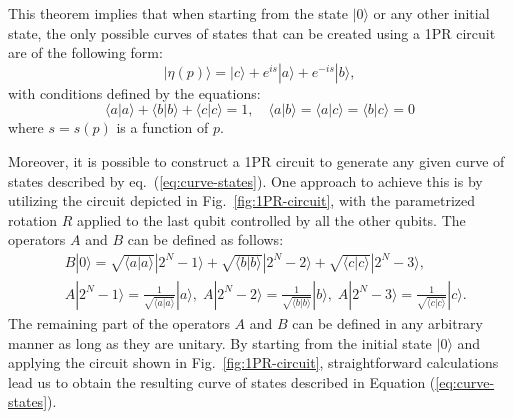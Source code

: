 \documentclass[10pt,letterpaper]{article} %
\newcommand{\fref}[1]{Fig.~\ref{#1}}
\newcommand{\eref}[1]{eq.~(\ref{#1})}
\begin{document}
This theorem implies that when starting from the state $|0\rangle$ 
or any other initial state, the only possible curves of states that can be 
created using a 1PR circuit are of the following form:
\begin{equation}
|\eta(p)\rangle = |c\rangle + e^{is}|a\rangle + e^{-is} |b\rangle,
\label{eq:curve-states}
\end{equation}
with conditions defined by the equations: 
\begin{equation}
\langle a| a\rangle + \langle b| b\rangle + \langle c| c\rangle = 1,  \quad
\langle a |b\rangle =
\langle a |c\rangle =
\langle b |c\rangle = 0
\label{eq:conditions-vecs}
\end{equation}
where $s = s(p)$ is a function of $p$. 

Moreover, it is possible to construct a 1PR circuit to generate any given curve of 
states described by \eref{eq:curve-states}. 
One approach to achieve this is by utilizing the circuit 
depicted in \fref{fig:1PR-circuit}, 
with the parametrized rotation $R$ applied to the last qubit controlled by all the 
other qubits. The operators $A$ and $B$ can be defined as follows:
\begin{align*}
&B|0\rangle = \sqrt{\langle a | a \rangle} |2^{N}-1 \rangle + \sqrt{\langle b | b \rangle} |2^{N}-2\rangle + \sqrt{\langle c |c \rangle} |2^N-3\rangle, \\
&A|2^N-1 \rangle = \frac{1}{\sqrt{\langle a | a \rangle}} |a\rangle,\; A|2^{N}-2\rangle = \frac{1}{\sqrt{\langle b | b \rangle}}|b\rangle, \; A|2^{N}-3\rangle = \frac{1}{\sqrt{\langle c | c \rangle}}|c\rangle.
\end{align*}
The remaining part of the operators $A$ and $B$ can be defined
in any arbitrary manner as long as they are unitary.
By starting from the initial state $|0\rangle$ and 
applying the circuit shown in \fref{fig:1PR-circuit}, straightforward calculations 
lead us to obtain the resulting curve of states described in Equation (\ref{eq:curve-states}).
\end{document}
